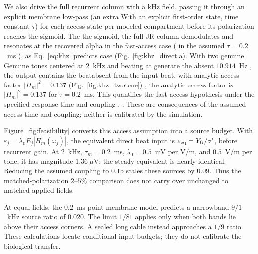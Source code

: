 \documentclass[11pt,a4paper]{article}
\newcommand{\Sig}{\sigma}
\providecommand{\DIFaddtex}[1]{{\protect\color{blue} \sf #1}} %
\providecommand{\DIFdeltex}[1]{{\protect\color{red} \scriptsize #1}} %
\providecommand{\DIFaddbegin}{} %
\providecommand{\DIFaddend}{} %
\providecommand{\DIFdelbegin}{} %
\providecommand{\DIFdelend}{} %
\providecommand{\DIFadd}[1]{\texorpdfstring{\DIFaddtex{#1}}{#1}} %
\providecommand{\DIFdel}[1]{\texorpdfstring{\DIFdeltex{#1}}{}} %
\begin{document}
\DIFdelbegin \DIFdel{We also drive the full recurrent column with a kHz field, passing it through
an explicit membrane low-pass (an extra }\DIFdelend \DIFaddbegin \DIFadd{With an explicit }\DIFaddend first-order \DIFdelbegin \DIFdel{state, time constant $\tau$) for
each }\DIFdelend \DIFaddbegin \DIFadd{access state per }\DIFaddend modeled compartment before
\DIFdelbegin \DIFdel{its polarization reaches the sigmoid. The
}\DIFdelend \DIFaddbegin \DIFadd{the sigmoid, the full JR }\DIFaddend column demodulates and resonates \DIFdelbegin \DIFdel{at the recovered alpha in the fast-access case
(}\DIFdelend \DIFaddbegin \DIFadd{in the assumed
}\DIFaddend $\tau=0.2$~ms \DIFdelbegin \DIFdel{), as
Eq.~\eqref{eq:khz} predicts }\DIFdelend \DIFaddbegin \DIFadd{case }\DIFaddend (Fig.~\ref{fig:khz_direct}a). \DIFdelbegin \DIFdel{With two genuine }\DIFdelend \DIFaddbegin \DIFadd{Genuine }\DIFaddend tones centered
at $2$~kHz \DIFdelbegin \DIFdel{and beating at }\DIFdelend \DIFaddbegin \DIFadd{generate the absent }\DIFaddend $10.914$~Hz \DIFdelbegin \DIFdel{, the output
contains the beatabsent from the input }\DIFdelend \DIFaddbegin \DIFadd{beat, with analytic access
factor $|H_m|^2=0.137$ }\DIFaddend (Fig.~\ref{fig:khz_twotone})\DIFdelbegin \DIFdel{; the analytic
access factor is $|H_m|^2=0.137$ for $\tau=0.2$~ms. This quantifies the fast-access
hypothesis under the specified response time and coupling .
}\DIFdelend \DIFaddbegin \DIFadd{. These are consequences
of the assumed access time and coupling; neither is calibrated by the simulation.
}\DIFaddend

\DIFaddbegin \DIFadd{Figure~\ref{fig:feasibility} converts this access assumption into a source
budget. With $\varepsilon_j=\lambda_0 E_j|H_m(\omega_j)|$, the equivalent
direct beat input is $\varepsilon_{\rm eq}=Y_\Omega/\Sig'$, before recurrent
gain. At $2$~kHz, $\tau_m=0.2$~ms, $\lambda_0=0.5$~mV per V/m, and
$0.5$~V/m per tone, it has magnitude $1.36~\mu$V; the steady equivalent
is nearly identical. Reducing the assumed coupling to $0.15$ scales these
sources by $0.09$. Thus the matched-polarization $2$--$5\%$ comparison does
not carry over unchanged to matched applied fields.
}

\DIFadd{At equal fields, the $0.2$~ms point-membrane model predicts a narrowband
$9/1$~kHz source ratio of $0.020$. The limit $1/81$ applies only when
both bands lie above their access corners. A sealed long cable instead
approaches a $1/9$ ratio. These calculations locate conditional input budgets;
they do not calibrate the biological transfer.
}
\end{document}
